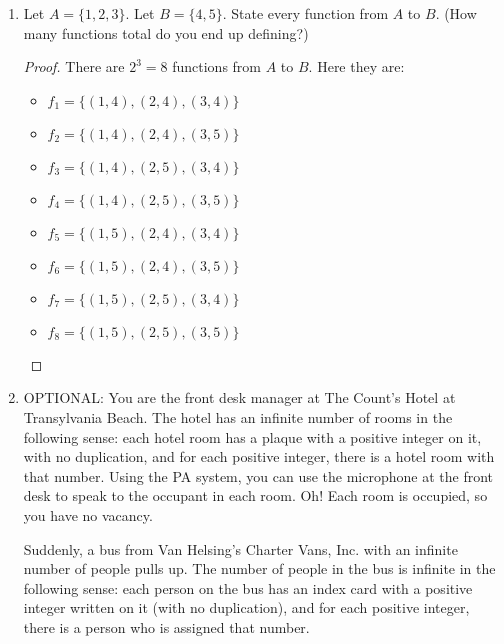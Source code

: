 \documentclass{article}
\begin{document}
\begin{enumerate}
\begin{proof}
    To show that $f$ is a function from $A$ to $B$, we need to show that for all $a \in A$, there is exactly one $b \in B$ such that $(a,b) \in f$. Since $6 \in A$, we need to show that there is exactly one $b \in B$ such that $(6,b) \in f$. Since $f = \{(6,8),(7,8)\}$, we see that there is exactly one $b \in B$ such that $(6,b) \in f$. Since $7 \in A$, we need to show that there is exactly one $b \in B$ such that $(7,b) \in f$. Since $f = \{(6,8),(7,8)\}$, we see that there is exactly one $b \in B$ such that $(7,b) \in f$. Therefore, $f$ is a function from $A$ to $B$.
\end{proof}

\newpage

\item Let $A = \{1,2,3\}$. Let $B = \{4,5\}$. State every function from $A$ to $B$. (How many functions total do you end up defining?)

\begin{proof}
    There are $2^3 = 8$ functions from $A$ to $B$. Here they are:
    \begin{itemize}
        \item $f_1 = \{(1,4),(2,4),(3,4)\}$
        \item $f_2 = \{(1,4),(2,4),(3,5)\}$
        \item $f_3 = \{(1,4),(2,5),(3,4)\}$
        \item $f_4 = \{(1,4),(2,5),(3,5)\}$
        \item $f_5 = \{(1,5),(2,4),(3,4)\}$
        \item $f_6 = \{(1,5),(2,4),(3,5)\}$
        \item $f_7 = \{(1,5),(2,5),(3,4)\}$
        \item $f_8 = \{(1,5),(2,5),(3,5)\}$
    \end{itemize}
\end{proof}

\newpage

\item OPTIONAL: You are the front desk manager at The Count's Hotel at Transylvania Beach. The hotel has an infinite number of rooms in the following sense: each hotel room has a plaque with a positive integer on it, with no duplication, and for each positive integer, there is a hotel room with that number. Using the PA system, you can use the microphone at the front desk to speak to the occupant in each room. Oh! Each room is occupied, so you have no vacancy. 

Suddenly, a bus from Van Helsing's Charter Vans, Inc. with an infinite number of people pulls up. The number of people in the bus is infinite in the following sense: each person on the bus has an index card with a positive integer written on it (with no duplication), and for each positive integer, there is a person who is assigned that number.


\end{enumerate}
\end{document}
